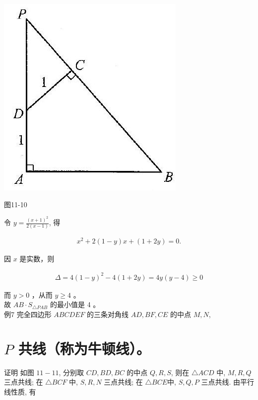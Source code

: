 \documentclass[10pt]{article}
\begin{document}
\begin{center}
\includegraphics[max width=\textwidth]{2024_10_30_2c8f45efd4a519b08e1ag-106}
\end{center}

图11-10

令 $y=\frac{(x+1)^{2}}{2(x-1)}$, 得

\begin{align*}
x^{2}+2(1-y) x+(1+2 y)=0 .
\end{align*}

因 $x$ 是实数，则

\begin{align*}
\Delta=4(1-y)^{2}-4(1+2 y)=4 y(y-4) \geqslant 0
\end{align*}

而 $y>0$ ，从而 $y \geqslant 4$ 。\\
故 $A B \cdot S_{\triangle P A B}$ 的最小值是 4 。\\
例7 完全四边形 $A B C D E F$ 的三条对角线 $A D, B F, C E$ 的中点 $M, N$,

\section*{$P$ 共线（称为牛顿线）。}
证明 如图 $11-11$, 分别取 $C D, B D, B C$ 的中点 $Q, R, S$, 则在 $\triangle A C D$ 中, $M, R, Q$ 三点共线; 在 $\triangle B C F$ 中, $S, R, N$ 三点共线; 在 $\triangle B C E$中, $S, Q, P$ 三点共线. 由平行线性质, 有
\end{document}
